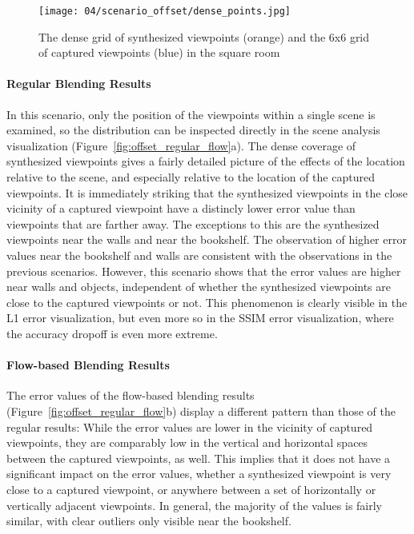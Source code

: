 \begin{figure}
		\centering
		\texttt{[image: 04/scenario\_offset/dense\_points.jpg]}
		\caption[The dense grid of synthesized viewpoints in the square room]{The dense grid of synthesized viewpoints (orange) and the 6x6 grid of captured viewpoints (blue) in the square room}
		\label{fig:scenario_offset_setup}
\end{figure}

\paragraph{Regular Blending Results}
In this scenario, only the position of the viewpoints within a single scene is examined, so the distribution can be inspected directly in the scene analysis visualization (Figure~\ref{fig:offset_regular_flow}a). The dense coverage of synthesized viewpoints gives a fairly detailed picture of the effects of the location relative to the scene, and especially relative to the location of the captured viewpoints. It is immediately striking that the synthesized viewpoints in the close vicinity of a captured viewpoint have a distincly lower error value than viewpoints that are farther away. The exceptions to this are the synthesized viewpoints near the walls and near the bookshelf. The observation of higher error values near the bookshelf and walls are consistent with the observations in the previous scenarios. However, this scenario shows that the error values are higher near walls and objects, independent of whether the synthesized viewpoints are close to the captured viewpoints or not. This phenomenon is clearly visible in the L1 error visualization, but even more so in the SSIM error visualization, where the accuracy dropoff is even more extreme. 


\paragraph{Flow-based Blending Results}
The error values of the flow-based blending results (Figure~\ref{fig:offset_regular_flow}b) display a different pattern than those of the regular results: While the error values are lower in the vicinity of captured viewpoints, they are comparably low in the vertical and horizontal spaces between the captured viewpoints, as well. This implies that it does not have a significant impact on the error values, whether a synthesized viewpoint is very close to a captured viewpoint, or anywhere between a set of horizontally or vertically adjacent viewpoints. In general, the majority of the values is fairly similar, with clear outliers only visible near the bookshelf.

